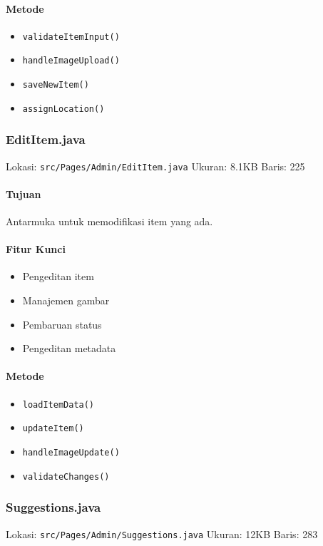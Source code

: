 \documentclass[12pt,a4paper]{article}
\begin{document}
\paragraph{Metode}
\begin{itemize}
    \item \texttt{validateItemInput()}
    \item \texttt{handleImageUpload()}
    \item \texttt{saveNewItem()}
    \item \texttt{assignLocation()}
\end{itemize}

\subsubsection{EditItem.java}
Lokasi: \texttt{src/Pages/Admin/EditItem.java}
Ukuran: 8.1KB
Baris: 225

\paragraph{Tujuan}
Antarmuka untuk memodifikasi item yang ada.

\paragraph{Fitur Kunci}
\begin{itemize}
    \item Pengeditan item
    \item Manajemen gambar
    \item Pembaruan status
    \item Pengeditan metadata
\end{itemize}

\paragraph{Metode}
\begin{itemize}
    \item \texttt{loadItemData()}
    \item \texttt{updateItem()}
    \item \texttt{handleImageUpdate()}
    \item \texttt{validateChanges()}
\end{itemize}

\subsubsection{Suggestions.java}
Lokasi: \texttt{src/Pages/Admin/Suggestions.java}
Ukuran: 12KB
Baris: 283
\end{document}

